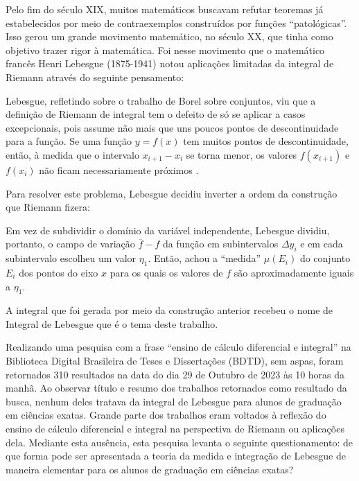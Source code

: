     Pelo fim do século XIX, muitos matemáticos buscavam refutar teoremas já estabelecidos por meio de contraexemplos construídos por funções \enquote{patológicas}\cite{boy}.
    Isso gerou um grande movimento matemático, no século XX, que tinha como objetivo trazer rigor à matemática.
    Foi nesse movimento que o matemático francês Henri Lebesgue (1875-1941) notou aplicações limitadas da integral de Riemann através do seguinte pensamento:
    
    \begin{citlon}
    	Lebesgue, refletindo sobre o trabalho de Borel sobre conjuntos, viu que a definição de Riemann de integral tem o defeito de só se aplicar a casos
    	excepcionais, pois assume não mais que uns poucos pontos de descontinuidade para a função.
    	Se uma função $y = f(x)$ tem muitos pontos de descontinuidade, então, à medida que o intervalo $x_{i+1} - x_i$
    	se torna menor, os valores $f(x_{i+1})$ e $f(x_i)$ não ficam
    	necessariamente próximos \cite[p.416]{boy}.  	
    \end{citlon}

    Para resolver este problema, Lebesgue decidiu inverter a ordem da construção que Riemann fizera:
    
    \begin{citlon}
    	Em vez de subdividir o domínio da variável independente, Lebesgue dividiu, portanto, o campo de variação $\overline{f} - f$ 
    	da função em subintervalos $\Delta y_i$ e em cada subintervalo
    	escolheu um valor $\eta_1$. 
    	Então, achou a \enquote{medida} $\mu(E_i)$ do conjunto $E_i$ dos pontos do eixo $x$ para os
    	quais os valores de $f$ são aproximadamente iguais a $\eta_1$\cite[p.416]{boy}.
    \end{citlon}
    
    A integral que foi gerada por meio da construção anterior recebeu o nome de Integral de Lebesgue que é o tema deste trabalho.
    
    Realizando uma pesquisa com a frase \enquote{ensino de cálculo diferencial e integral} na Biblioteca Digital Brasileira de Teses e Dissertações (BDTD), sem
    aspas, foram retornados 310 resultados na data do dia 29 de Outubro de 2023 às 10 horas da manhã.
    Ao observar título e resumo dos trabalhos retornados como resultado da busca, nenhum deles tratava da integral de Lebesgue para alunos de graduação em ciências exatas.
    Grande parte dos trabalhos eram voltados à reflexão do ensino de cálculo diferencial e integral na perspectiva de Riemann ou aplicações dela.
    Mediante esta ausência, esta pesquisa levanta o seguinte questionamento: de que forma pode ser apresentada a teoria da medida e integração de Lebesgue de maneira elementar para os alunos de graduação em ciências exatas?
    
